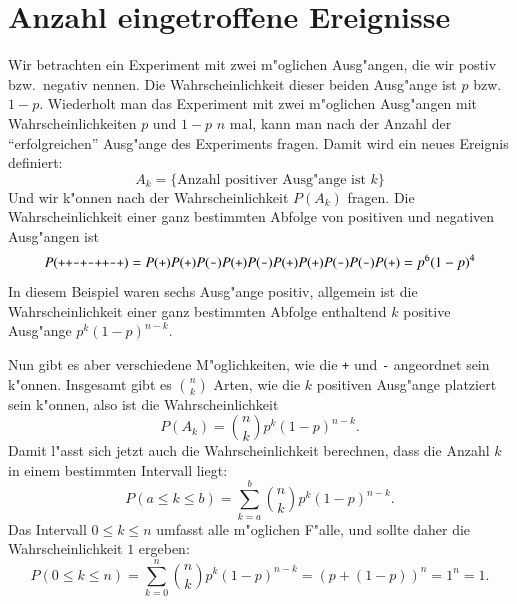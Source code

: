 \section{Anzahl eingetroffene Ereignisse}
Wir betrachten ein Experiment mit zwei m"oglichen Ausg"angen, die
wir postiv bzw.~negativ nennen. Die Wahrscheinlichkeit dieser beiden
Ausg"ange ist $p$ bzw.~$1-p$.
Wiederholt man das Experiment mit zwei m"oglichen Ausg"angen mit
Wahrscheinlichkeiten $p$ und $1-p$ $n$ mal, kann man nach der Anzahl 
der ``erfolgreichen'' Ausg"ange des Experiments fragen. Damit wird
ein neues Ereignis definiert: 
\[
A_k=\{\text{Anzahl positiver Ausg"ange ist $k$}\}
\]
Und wir k"onnen nach der Wahrscheinlichkeit $P(A_k)$ fragen.
Die Wahrscheinlichkeit einer ganz bestimmten Abfolge von positiven
und negativen Ausg"angen ist 
\[
P(\text{\tt ++-+-++--+})=
P(\text{\tt +})
P(\text{\tt +})
P(\text{\tt -})
P(\text{\tt +})
P(\text{\tt -})
P(\text{\tt +})
P(\text{\tt +})
P(\text{\tt -})
P(\text{\tt -})
P(\text{\tt +})
=p^6(1-p)^4
\]
In diesem Beispiel waren sechs Ausg"ange positiv, allgemein ist die
Wahrscheinlichkeit einer ganz bestimmten Abfolge enthaltend $k$ positive
Ausg"ange $p^k(1-p)^{n-k}$.

Nun gibt es aber verschiedene M"oglichkeiten, wie die {\tt +}
und {\tt -} angeordnet sein k"onnen. Insgesamt gibt es 
$\binom{n}k$ Arten, wie die $k$ positiven Ausg"ange platziert sein
k"onnen, also ist die Wahrscheinlichkeit
\[
P(A_k)=
\binom{n}{k}p^k(1-p)^{n-k}.
\]
Damit l"asst sich jetzt auch die Wahrscheinlichkeit berechnen, dass die
Anzahl $k$ in einem bestimmten Intervall liegt:
\[
P(a \le k\le b)
=
\sum_{k=a}^b \binom{n}{k}p^k(1-p)^{n-k}.
\]
Das Intervall $0\le k\le n$ umfasst alle m"oglichen F"alle, und sollte
daher die Wahrscheinlichkeit $1$ ergeben:
\[
P(0\le k\le n)=
\sum_{k=0}^n \binom{n}{k}p^k(1-p)^{n-k}=
(p+(1-p))^n=1^n=1.
\]



